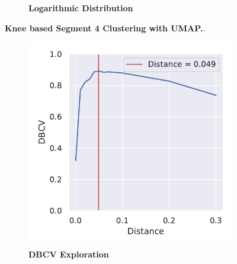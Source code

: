 \begin{figure}
\begin{adjustbox}{minipage=\dimexpr{}\fboxrule,fbox}
\begin{subfigure}[b]{0.475\textwidth}
            \caption[Logarithmic Distribution]{\textbf{Logarithmic Distribution}}
            \label{subfig:UMAP_Cluster_Knee_Distribution_log_4}
        \end{subfigure}
    \end{adjustbox}
    \caption[Knee based Segment 4 Clustering with \Acrshort{UMAP}]{\textbf{Knee based Segment 4 Clustering with \Acrshort{UMAP}.}.}
    \label{fig:UMAP_Cluster_Knee_4}
\end{figure}

\begin{figure}
    \begin{adjustbox}{minipage=\dimexpr{}\fboxrule,fbox}
        \begin{subfigure}[b]{0.475\textwidth}
            \includegraphics[width=\textwidth]{UMAP/Cluster_DBCV_Segment_4.pdf}
            \caption[\Acrshort{DBCV} Exploration]{\textbf{\Acrshort{DBCV} Exploration}}
            \label{subfig:UMAP_Cluster_DBCV_Explo_4}
        \end{subfigure}
        \hfill
        \begin{subfigure}[b]{0.475\textwidth}

\end{subfigure}
\end{adjustbox}
\end{figure}
